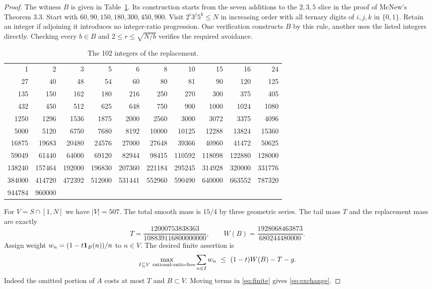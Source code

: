 \documentclass[11pt]{article}
\begin{document}
\begin{proof}
The witness $B$ is given in Table~\ref{tab:B}. Its construction starts from the seven additions to the $2,3,5$ slice in the proof of McNew's Theorem 3.3. Start with $60,90,150,180,300,450,900$. Visit $2^i3^j5^k\le N$ in increasing order with all ternary digits of $i,j,k$ in $\{0,1\}$. Retain an integer if adjoining it introduces no integer-ratio progression. One verification constructs $B$ by this rule, another uses the listed integers directly. Checking every $b\in B$ and $2\le r\le\sqrt{N/b}$ verifies the required avoidance.
\begin{table}[ht]\centering\small
\caption{The 102 integers of the replacement.}\label{tab:B}
\begin{tabular}{rrrrrrrrrr}\toprule
1 & 2 & 3 & 5 & 6 & 8 & 10 & 15 & 16 & 24 \\
27 & 40 & 48 & 54 & 60 & 80 & 81 & 90 & 120 & 125 \\
135 & 150 & 162 & 180 & 216 & 250 & 270 & 300 & 375 & 405 \\
432 & 450 & 512 & 625 & 648 & 750 & 900 & 1000 & 1024 & 1080 \\
1250 & 1296 & 1536 & 1875 & 2000 & 2560 & 3000 & 3072 & 3375 & 4096 \\
5000 & 5120 & 6750 & 7680 & 8192 & 10000 & 10125 & 12288 & 13824 & 15360 \\
16875 & 19683 & 20480 & 24576 & 27000 & 27648 & 39366 & 40960 & 41472 & 50625 \\
59049 & 61440 & 64000 & 69120 & 82944 & 98415 & 110592 & 118098 & 122880 & 128000 \\
138240 & 157464 & 192000 & 196830 & 207360 & 221184 & 295245 & 314928 & 320000 & 331776 \\
384000 & 414720 & 472392 & 512000 & 531441 & 552960 & 590490 & 640000 & 663552 & 787320 \\
944784 & 960000 \\
\bottomrule\end{tabular}
\end{table}
For $V=S\cap[1,N]$ we have $|V|=507$. The total smooth mass is $15/4$ by three geometric series. The tail mass $T$ and the replacement mass are exactly
\[
   T=\frac{12000753838363}{108839116800000000},\qquad
   W(B)=\frac{1928068463873}{680244480000}.
\]
Assign weight $w_n=(1-t\mathbf 1_B(n))/n$ to $n\in V$. The desired finite assertion is
\begin{equation}
 \max_{I\subseteq V\ {\rm rational\text{-}ratio\text{-}free}}\sum_{n\in I}w_n
 \ \le\ (1-t)W(B)-T-g.\label{eq:finite}
\end{equation}
Indeed the omitted portion of $A$ costs at most $T$ and $B\subset V$. Moving terms in \eqref{eq:finite} gives \eqref{eq:exchange}.


\end{proof}
\end{document}
